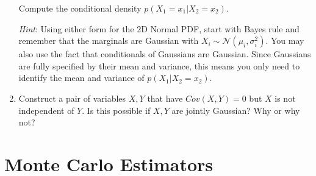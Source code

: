 \documentclass[11pt]{article}
\begin{document}
\begin{enumerate}[label=(\Alph*)]
            
            Compute the conditional density $p(X_1=x_1|X_2=x_2)$.
            
            \textit{Hint}: Using either form for the 2D Normal PDF, 
            start with Bayes rule and remember that the marginals are Gaussian with $X_i \sim \mathcal{N}(\mu_{i},\sigma_i^2)$.
            You may also use the fact that conditionals of Gaussians are Gaussian. Since Gaussians are fully specified by their mean and variance, this means you only need to
            identify the mean and variance of $p(X_1|X_2=x_2)$.


            \item Construct a pair of variables $X,Y$ that have $Cov(X,Y)=0$ but
            $X$ is not independent of $Y$. Is this possible if $X,Y$ are jointly
            Gaussian? Why or why not?


   \end{enumerate}

\newpage 

\section{Monte Carlo Estimators} 
\end{document}
